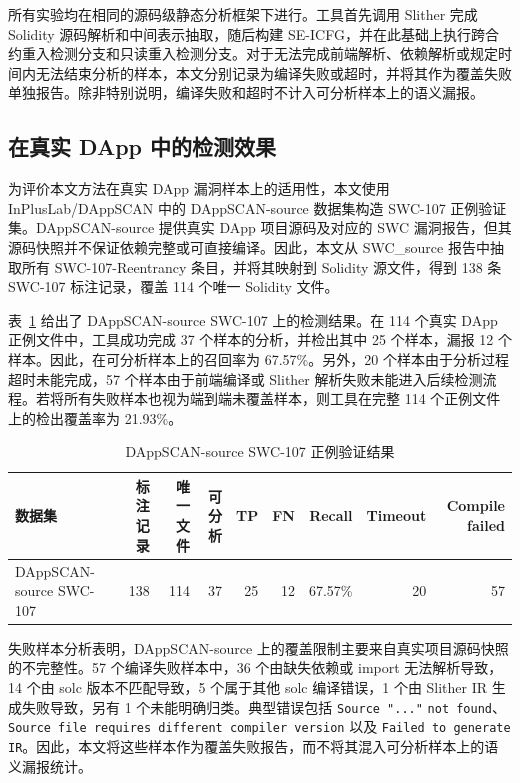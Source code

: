 所有实验均在相同的源码级静态分析框架下进行。工具首先调用 Slither 完成 Solidity 源码解析和中间表示抽取，随后构建 SE-ICFG，并在此基础上执行跨合约重入检测分支和只读重入检测分支。对于无法完成前端解析、依赖解析或规定时间内无法结束分析的样本，本文分别记录为编译失败或超时，并将其作为覆盖失败单独报告。除非特别说明，编译失败和超时不计入可分析样本上的语义漏报。

\subsection{在真实 DApp 中的检测效果}

为评价本文方法在真实 DApp 漏洞样本上的适用性，本文使用 InPlusLab/DAppSCAN 中的 DAppSCAN-source 数据集构造 SWC-107 正例验证集。DAppSCAN-source 提供真实 DApp 项目源码及对应的 SWC 漏洞报告，但其源码快照并不保证依赖完整或可直接编译。因此，本文从 SWC\_source 报告中抽取所有 SWC-107-Reentrancy 条目，并将其映射到 Solidity 源文件，得到 138 条 SWC-107 标注记录，覆盖 114 个唯一 Solidity 文件。

表~\ref{tab:dappscan-result} 给出了 DAppSCAN-source SWC-107 上的检测结果。在 114 个真实 DApp 正例文件中，工具成功完成 37 个样本的分析，并检出其中 25 个样本，漏报 12 个样本。因此，在可分析样本上的召回率为 67.57\%。另外，20 个样本由于分析过程超时未能完成，57 个样本由于前端编译或 Slither 解析失败未能进入后续检测流程。若将所有失败样本也视为端到端未覆盖样本，则工具在完整 114 个正例文件上的检出覆盖率为 21.93\%。

\begin{table}[htbp]
\centering
\caption{DAppSCAN-source SWC-107 正例验证结果}
\label{tab:dappscan-result}
\begin{tabular}{lrrrrrrrr}
\toprule
数据集 & 标注记录 & 唯一文件 & 可分析 & TP & FN & Recall & Timeout & Compile failed \\
\midrule
DAppSCAN-source SWC-107 & 138 & 114 & 37 & 25 & 12 & 67.57\% & 20 & 57 \\
\bottomrule
\end{tabular}
\end{table}

失败样本分析表明，DAppSCAN-source 上的覆盖限制主要来自真实项目源码快照的不完整性。57 个编译失败样本中，36 个由缺失依赖或 import 无法解析导致，14 个由 solc 版本不匹配导致，5 个属于其他 solc 编译错误，1 个由 Slither IR 生成失败导致，另有 1 个未能明确归类。典型错误包括 \texttt{Source "..."} \texttt{not found}、\texttt{Source file requires different compiler version} 以及 \texttt{Failed to generate IR}。因此，本文将这些样本作为覆盖失败报告，而不将其混入可分析样本上的语义漏报统计。

